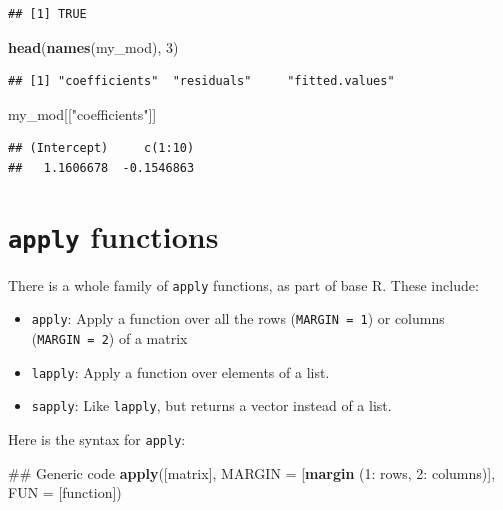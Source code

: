 \documentclass[]{book}
\makeatletter
\newenvironment{Shaded}{\begin{snugshade}}{\end{snugshade}}
\newcommand{\KeywordTok}[1]{\textcolor[rgb]{0.13,0.29,0.53}{\textbf{{#1}}}}
\newcommand{\DataTypeTok}[1]{\textcolor[rgb]{0.13,0.29,0.53}{{#1}}}
\newcommand{\DecValTok}[1]{\textcolor[rgb]{0.00,0.00,0.81}{{#1}}}
\newcommand{\StringTok}[1]{\textcolor[rgb]{0.31,0.60,0.02}{{#1}}}
\newcommand{\NormalTok}[1]{{#1}}
\providecommand{\tightlist}{%
  \setlength{\itemsep}{0pt}\setlength{\parskip}{0pt}}
\newenvironment{kframe}{%
\medskip{}
\setlength{\fboxsep}{.8em}
 \def\at@end@of@kframe{}%
 \ifinner\ifhmode%
  \def\at@end@of@kframe{\end{minipage}}%
  \begin{minipage}{\columnwidth}%
 \fi\fi%
 \def\FrameCommand##1{\hskip\@totalleftmargin \hskip-\fboxsep
 \colorbox{shadecolor}{##1}\hskip-\fboxsep
     \hskip-\linewidth \hskip-\@totalleftmargin \hskip\columnwidth}%
 \MakeFramed {\advance\hsize-\width
   \@totalleftmargin\z@ \linewidth\hsize
   \@setminipage}}%
 {\par\unskip\endMakeFramed%
 \at@end@of@kframe}
\renewenvironment{Shaded}{\begin{kframe}}{\end{kframe}}
\makeatother
\begin{document}
\begin{verbatim}
## [1] TRUE
\end{verbatim}

\begin{Shaded}
\begin{Highlighting}[]
\KeywordTok{head}\NormalTok{(}\KeywordTok{names}\NormalTok{(my_mod), }\DecValTok{3}\NormalTok{)}
\end{Highlighting}
\end{Shaded}

\begin{verbatim}
## [1] "coefficients"  "residuals"     "fitted.values"
\end{verbatim}

\begin{Shaded}
\begin{Highlighting}[]
\NormalTok{my_mod[[}\StringTok{"coefficients"}\NormalTok{]]}
\end{Highlighting}
\end{Shaded}

\begin{verbatim}
## (Intercept)     c(1:10) 
##   1.1606678  -0.1546863
\end{verbatim}

\section{\texorpdfstring{\texttt{apply}
functions}{apply functions}}\label{apply-functions}

There is a whole family of \texttt{apply} functions, as part of base R.
These include:

\begin{itemize}
\tightlist
\item
  \texttt{apply}: Apply a function over all the rows
  (\texttt{MARGIN\ =\ 1}) or columns (\texttt{MARGIN\ =\ 2}) of a matrix
\item
  \texttt{lapply}: Apply a function over elements of a list.
\item
  \texttt{sapply}: Like \texttt{lapply}, but returns a vector instead of
  a list.
\end{itemize}

Here is the syntax for \texttt{apply}:

\begin{Shaded}
\begin{Highlighting}[]
\NormalTok{## Generic code}
\KeywordTok{apply}\NormalTok{([matrix], }\DataTypeTok{MARGIN =} \NormalTok{[}\KeywordTok{margin} \NormalTok{(}\DecValTok{1}\NormalTok{:}\StringTok{ }\NormalTok{rows, }\DecValTok{2}\NormalTok{:}\StringTok{ }\NormalTok{columns)],}
      \DataTypeTok{FUN =}  \NormalTok{[function])}
\end{Highlighting}
\end{Shaded}
\end{document}
